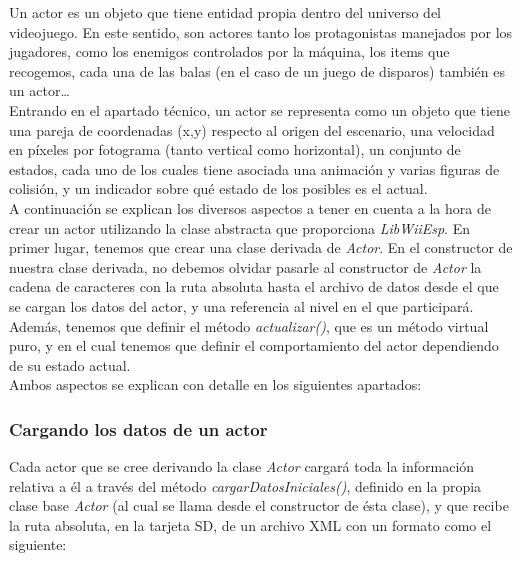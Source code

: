 
Un actor es un objeto que tiene entidad propia dentro del universo del videojuego. En este sentido, son actores tanto los protagonistas manejados por los jugadores, como los enemigos controlados por la máquina, los items que recogemos, cada una de las balas (en el caso de un juego de disparos) también es un actor\ldots \\

Entrando en el apartado técnico, un actor se representa como un objeto que tiene una pareja de coordenadas (x,y) respecto al origen del escenario, una velocidad en píxeles por fotograma (tanto vertical como horizontal), un conjunto de estados, cada uno de los cuales tiene asociada una animación y varias figuras de colisión, y un indicador sobre qué estado de los posibles es el actual.\\

A continuación se explican los diversos aspectos a tener en cuenta a la hora de crear un actor utilizando la clase abstracta que proporciona \emph{LibWiiEsp}. En primer lugar, tenemos que crear una clase derivada de \emph{Actor}. En el constructor de nuestra clase derivada, no debemos olvidar pasarle al constructor de \emph{Actor} la cadena de caracteres con la ruta absoluta hasta el archivo de datos desde el que se cargan los datos del actor, y una referencia al nivel en el que participará. Además, tenemos que definir el método \emph{actualizar()}, que es un método virtual puro, y en el cual tenemos que definir el comportamiento del actor dependiendo de su estado actual.\\

Ambos aspectos se explican con detalle en los siguientes apartados:

\subsubsection{Cargando los datos de un actor}

Cada actor que se cree derivando la clase \emph{Actor} cargará toda la información relativa a él a través del método \emph{cargarDatosIniciales()}, definido en la propia clase base \emph{Actor} (al cual se llama desde el constructor de ésta clase), y que recibe la ruta absoluta, en la tarjeta SD, de un archivo XML con un formato como el siguiente:\\

